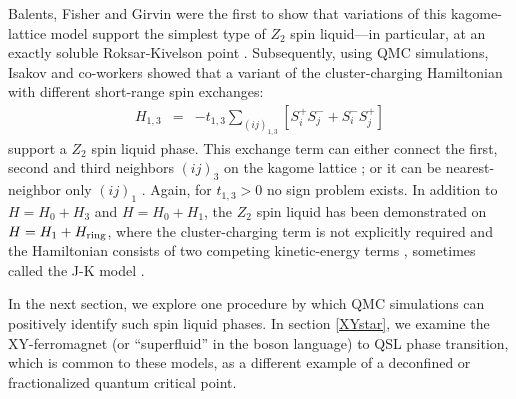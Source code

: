 \documentclass[range]{ar2e}
\begin{document}
Balents, Fisher and Girvin \cite{BFG} were the first to show that variations of this kagome-lattice model support the simplest type of $Z_2$ spin liquid---in particular, at an exactly soluble Roksar-Kivelson point \cite{Rokhsar88}.  Subsequently, using QMC simulations, Isakov and co-workers showed that a variant of the cluster-charging Hamiltonian with different short-range spin exchanges: 
\begin{eqnarray}
H_{1,3} &=& -t_{1,3} \sum_{( ij )_{1,3}} [S^{+}_i S^-_j + S^-_i S^{+}_j]  
\end{eqnarray}
support a $Z_2$ spin liquid phase.  This exchange term can either connect the first, second and third neighbors $( ij )_3$ on the kagome lattice \cite{Isakov1,Isakov2}; or it can be nearest-neighbor only $( ij )_1$ \cite{TopoEE}.  Again, for $t_{1,3}>0$ no sign problem exists. 
In addition to  $H = H_0 + H_3$ and $H = H_0 + H_1$, the $Z_2$ spin liquid has been demonstrated on $H = H_1 + H_{\rm ring}$, where the cluster-charging term is not explicitly required and the Hamiltonian consists of two competing kinetic-energy terms \cite{Long}, sometimes called the J-K model \cite{JKqmc}.



In the next section, we explore one procedure by which QMC simulations can positively identify such spin liquid phases.  In section \ref{XYstar}, we examine the XY-ferromagnet (or ``superfluid'' in the boson language) to QSL phase transition, which is common to these models, as a different example of a deconfined or fractionalized quantum critical point.
\end{document}
